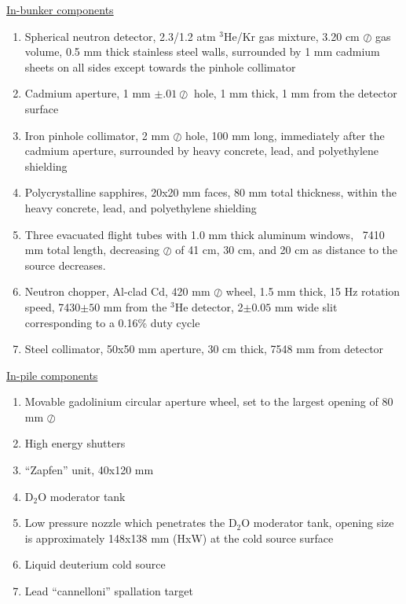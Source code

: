 \documentclass[5p,12pt]{elsarticle}
\begin{document}
\begin{center} \underline{In-bunker components}\end{center}
\begin{enumerate}
  \item Spherical neutron detector, 2.3/1.2 atm $^3$He/Kr gas mixture, 3.20 cm $\oslash$ gas volume, 0.5 mm thick stainless steel walls, surrounded by 1 mm cadmium sheets on all sides except towards the pinhole collimator
  \item Cadmium aperture, 1 mm $\pm.01 \oslash$ hole, 1 mm thick, 1 mm from the detector surface
  \item Iron pinhole collimator, 2 mm $\oslash$ hole, 100 mm long, immediately after the cadmium aperture, surrounded by heavy concrete, lead, and polyethylene shielding
  \item Polycrystalline sapphires, 20x20 mm faces, 80 mm total thickness, within the heavy concrete, lead, and polyethylene shielding
  \item Three evacuated flight tubes with 1.0 mm thick aluminum windows, ~7410 mm total length, decreasing $\oslash$ of 41 cm, 30 cm, and 20 cm as distance to the source decreases. 
  \item Neutron chopper, Al-clad Cd, 420 mm $\oslash$ wheel, 1.5 mm thick, 15 Hz rotation speed, 7430$\pm 50$ mm from the $^3$He detector, 2$\pm 0.05$ mm wide slit corresponding to a 0.16\% duty cycle
  \item Steel collimator, 50x50 mm aperture, 30 cm thick, 7548 mm from detector
\end{enumerate}
\begin{center}\underline{In-pile components}\end{center}
\begin{enumerate}[resume]
  \item Movable gadolinium circular aperture wheel, set to the largest opening of 80 mm $\oslash$
  \item High energy shutters
  \item ``Zapfen'' unit, 40x120 mm
  \item D$_2$O moderator tank
  \item Low pressure nozzle which penetrates the D$_2$O moderator tank, opening size is approximately 148x138 mm (HxW) at the cold source surface
  \item Liquid deuterium cold source
  \item Lead ``cannelloni'' spallation target
\end{enumerate}
\end{document}
